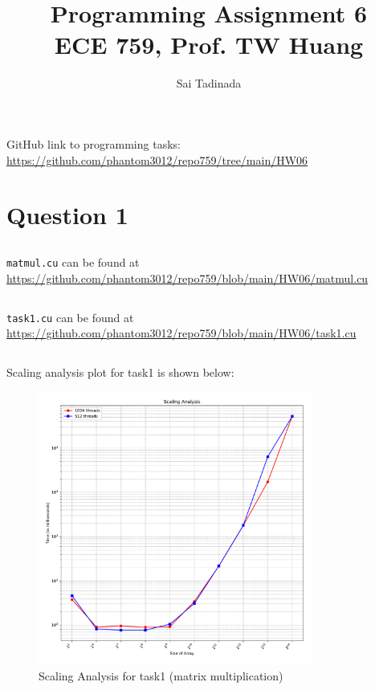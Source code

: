 \documentclass[12pt]{article}
\title{Programming Assignment 6 \\ \small{ECE 759, Prof. TW Huang}}
\author{Sai Tadinada}
\date{}
\begin{document}
\maketitle

GitHub link to programming tasks: \\ \url{https://github.com/phantom3012/repo759/tree/main/HW06}

\section{Question 1}
\subsection{}
\texttt{matmul.cu} can be found at \url{https://github.com/phantom3012/repo759/blob/main/HW06/matmul.cu}
\subsection{}
\texttt{task1.cu} can be found at \url{https://github.com/phantom3012/repo759/blob/main/HW06/task1.cu}
\subsection{}
Scaling analysis plot for task1 is shown below:
\begin{figure}[ht]
    \centering
    \includegraphics[width=0.8\textwidth]{task1.pdf}
    \caption{Scaling Analysis for task1 (matrix multiplication)}
\end{figure}
\end{document}
